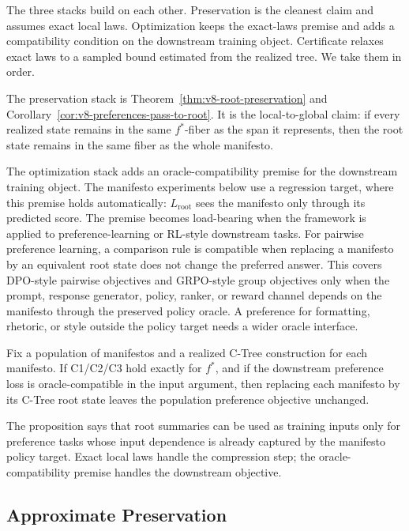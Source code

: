 The three stacks build on each other. Preservation is the cleanest
claim and assumes exact local laws. Optimization keeps the exact-laws
premise and adds a compatibility condition on the downstream training
object. Certificate relaxes exact laws to a sampled bound estimated
from the realized tree. We take them in order.

The preservation stack is Theorem~\ref{thm:v8-root-preservation} and
Corollary~\ref{cor:v8-preferences-pass-to-root}. It is the
local-to-global claim: if every realized state remains in the same
\(f^\ast\)-fiber as the span it represents, then the root state
remains in the same fiber as the whole manifesto.

The optimization stack adds an oracle-compatibility premise for the
downstream training object. The manifesto experiments below use a
regression target, where this premise holds automatically:
\(L_{\mathrm{root}}\) sees the manifesto only through its predicted
score. The premise becomes load-bearing when the framework is applied
to preference-learning or RL-style downstream tasks. For pairwise
preference learning, a comparison rule is compatible when replacing a
manifesto by an equivalent root state does not change the preferred
answer. This covers DPO-style pairwise objectives
\citep{BradleyTerry1952,RafailovEtAl2023DPO} and GRPO-style group
objectives only when the prompt, response generator, policy, ranker,
or reward channel depends on the manifesto through the preserved
policy oracle. A preference for formatting, rhetoric, or style
outside the policy target needs a wider oracle interface.

\begin{proposition}
\label{prop:v8-manifesto-preference-equivalence}
Fix a population of manifestos and a realized C-Tree construction for each
manifesto. If C1/C2/C3 hold exactly for \(f^\ast\), and if the downstream
preference loss is oracle-compatible in the input argument, then replacing each
manifesto by its C-Tree root state leaves the population preference objective
unchanged.
\end{proposition}

The proposition says that root summaries can be used as training inputs only
for preference tasks whose input dependence is already captured by the
manifesto policy target. Exact local laws handle the compression step; the
oracle-compatibility premise handles the downstream objective.

\subsection{Approximate Preservation}

